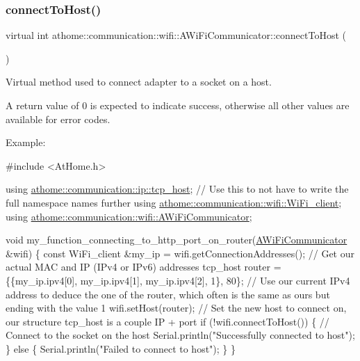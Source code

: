 \subsubsection{\texorpdfstring{connect\+To\+Host()}{connectToHost()}}
{\footnotesize\ttfamily virtual int athome\+::communication\+::wifi\+::\+A\+Wi\+Fi\+Communicator\+::connect\+To\+Host (\begin{DoxyParamCaption}{ }\end{DoxyParamCaption})\hspace{0.3cm}{\ttfamily [pure virtual]}}

Virtual method used to connect adapter to a socket on a host.

A return value of 0 is expected to indicate success, otherwise all other values are available for error codes.

Example\+:


\begin{DoxyCode}
\textcolor{preprocessor}{#include <AtHome.h>}

\textcolor{keyword}{using} \mbox{\hyperlink{structathome_1_1communication_1_1ip_1_1s__host}{athome::communication::ip::tcp\_host}}; \textcolor{comment}{// Use this to not have to
       write the full namespace names further}
\textcolor{keyword}{using} \mbox{\hyperlink{structathome_1_1communication_1_1wifi_1_1s__wifi__client}{athome::communication::wifi::WiFi\_client}};
\textcolor{keyword}{using} \mbox{\hyperlink{classathome_1_1communication_1_1wifi_1_1_a_wi_fi_communicator}{athome::communication::wifi::AWiFiCommunicator}};

\textcolor{keywordtype}{void} my\_function\_connecting\_to\_http\_port\_on\_router(\mbox{\hyperlink{classathome_1_1communication_1_1wifi_1_1_a_wi_fi_communicator_a0098148fe8d0eeee99b7f8f72a72a900}{AWiFiCommunicator}} &wifi) \{
  \textcolor{keyword}{const} WiFi\_client &my\_ip = wifi.getConnectionAddresses(); \textcolor{comment}{// Get our actual MAC and IP (IPv4 or IPv6)
       addresses}
  tcp\_host router = \{\{my\_ip.ipv4[0], my\_ip.ipv4[1], my\_ip.ipv4[2], 1\}, 80\}; \textcolor{comment}{// Use our current IPv4 address
       to deduce the one of the router, which often is the same as ours but ending with the value 1}
  wifi.setHost(router); \textcolor{comment}{// Set the new host to connect on, our structure tcp\_host is a couple IP + port}
  \textcolor{keywordflow}{if} (!wifi.connectToHost()) \{ \textcolor{comment}{// Connect to the socket on the host}
    Serial.println(\textcolor{stringliteral}{"Successfully connected to host"});
  \} \textcolor{keywordflow}{else} \{
    Serial.println(\textcolor{stringliteral}{"Failed to connect to host"});
  \}
\}
\end{DoxyCode}
 

